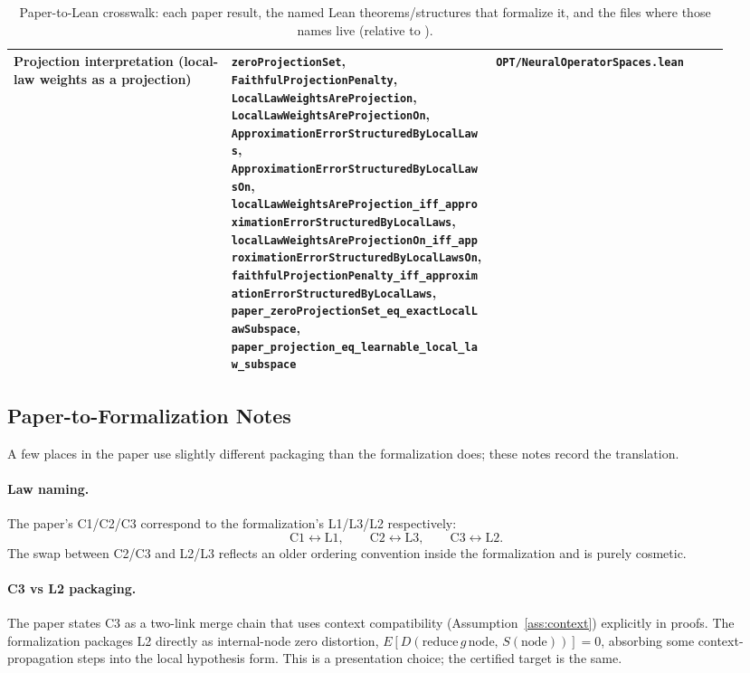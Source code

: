 \begin{table}[h]
\begin{tabular}{p{0.28\linewidth}p{0.34\linewidth}p{0.30\linewidth}}
Projection interpretation (local-law weights as a projection) &
\texttt{zeroProjectionSet}, \texttt{FaithfulProjectionPenalty}, \texttt{LocalLawWeightsAreProjection}, \texttt{LocalLawWeightsAreProjectionOn}, \texttt{ApproximationErrorStructuredByLocalLaws}, \texttt{ApproximationErrorStructuredByLocalLawsOn}, \texttt{localLawWeightsAreProjection\_iff\_approximationErrorStructuredByLocalLaws}, \texttt{localLawWeightsAreProjectionOn\_iff\_approximationErrorStructuredByLocalLawsOn}, \texttt{faithfulProjectionPenalty\_iff\_approximationErrorStructuredByLocalLaws}, \texttt{paper\_zeroProjectionSet\_eq\_exactLocalLawSubspace}, \texttt{paper\_projection\_eq\_learnable\_local\_law\_subspace} &
\texttt{OPT/NeuralOperatorSpaces.lean} \\
\bottomrule
\end{tabular}
\caption{Paper-to-Lean crosswalk: each paper result, the named Lean theorems/structures that formalize it, and the files where those names live (relative to \leanrepo).}
\end{table}

\subsection{Paper-to-Formalization Notes}

A few places in the paper use slightly different packaging than the
formalization does; these notes record the translation.

\paragraph{Law naming.} The paper's C1/C2/C3 correspond to the
formalization's L1/L3/L2 respectively:
\[
\text{C1} \leftrightarrow \text{L1},\qquad
\text{C2} \leftrightarrow \text{L3},\qquad
\text{C3} \leftrightarrow \text{L2}.
\]
The swap between C2/C3 and L2/L3 reflects an older ordering convention
inside the formalization and is purely cosmetic.

\paragraph{C3 vs L2 packaging.} The paper states C3 as a two-link merge
chain that uses context compatibility
(Assumption~\ref{ass:context}) explicitly in proofs. The formalization
packages L2 directly as internal-node zero distortion,
$E[D(\mathrm{reduce}\,g\,\mathrm{node},\,S(\mathrm{node}))]=0$, absorbing
some context-propagation steps into the local hypothesis form. This is
a presentation choice; the certified target is the same.

